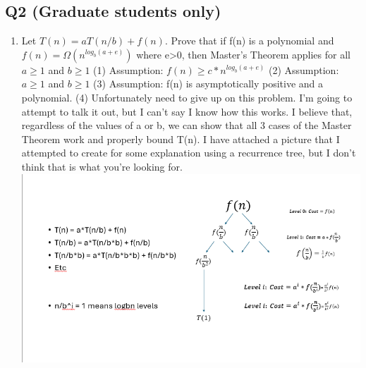\documentclass{article}
\begin{document}
\subsection*{Q2 (Graduate students only)}
\begin{enumerate}[label=(\alph*)]
    \item Let $T(n) = aT(n/b) + f(n)$. Prove that if f(n) is a polynomial and $f(n) = \Omega(n^{log_{b}(a+e)})$ where e>0, then Master's Theorem applies for all $a \geq 1$ and $b \geq 1$
    \subitem (1) Assumption: $f(n) \geq c * n^{log_{b}(a+e)}$
    \subitem (2) Assumption: $a \geq 1$ and $b \geq 1$
    \subitem (3) Assumption: f(n) is asymptotically positive and a polynomial.
    \subitem (4) Unfortunately need to give up on this problem. I'm going to attempt to talk it out, but I can't say I know how this works. I believe that, regardless of the values of a or b, we can show that all 3 cases of the Master Theorem work and properly bound T(n). I have attached a picture that I attempted to create for some explanation using a recurrence tree, but I don't think that is what you're looking for.
    \subitem \subitem \includegraphics[width=1\textwidth]{masters.png}

\end{enumerate}
\end{document}

